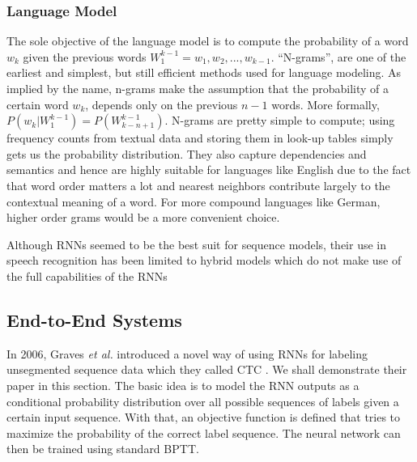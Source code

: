\subsubsection{Language Model} 
\label{bg:s3_sub1_subsub3}

The sole objective of the language model is to compute the probability of a word $w_k$ given the previous words $W_1^{k-1} = w_1,w_2,...,w_{k-1}$. \enquote{N-grams}, are one of the earliest and simplest, but still efficient methods used for language modeling. As implied by the name, n-grams make the assumption that the probability of a certain word $w_k$, depends only on the previous $n-1$ words. More formally, $P(w_k|W_1^{k-1}) = P(W_{k-n+1}^{k-1}) $. N-grams are pretty simple to compute; using frequency counts from textual data and storing them in look-up tables simply gets us the probability distribution. They also capture dependencies and semantics and hence are highly suitable for languages like English due to the fact that word order matters a lot and nearest neighbors contribute largely to the contextual meaning of a word. For more compound languages like German, higher order grams would be a more convenient choice.  




Although \ac{RNN}s seemed to be the best suit for sequence models, their use in speech recognition has been limited to hybrid models which do not make use of the full capabilities of the \ac{RNN}s




\subsection{End-to-End Systems} 
\label{bg:s3_sub2}


In 2006, Graves \textit{et al.} introduced a novel way of using \ac{RNN}s for labeling unsegmented sequence data which they called \ac{CTC} \cite{graves2006connectionist}. We shall demonstrate their paper in this section. 
The basic idea is to model the \ac{RNN} outputs as a conditional probability distribution over all possible sequences of labels given a certain input sequence. With that, an objective function is defined that tries to maximize the probability of the correct label sequence. The neural network can then be trained using standard \ac{BPTT}.

